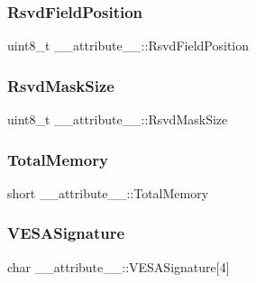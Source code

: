 \subsubsection{\texorpdfstring{Rsvd\+Field\+Position}{RsvdFieldPosition}}
{\footnotesize\ttfamily uint8\+\_\+t \+\_\+\+\_\+attribute\+\_\+\+\_\+\+::\+Rsvd\+Field\+Position}

\hypertarget{struct____attribute_____a73862db83bdb9b6d31356af3cec7a5be}{}\label{struct____attribute_____a73862db83bdb9b6d31356af3cec7a5be} 
\subsubsection{\texorpdfstring{Rsvd\+Mask\+Size}{RsvdMaskSize}}
{\footnotesize\ttfamily uint8\+\_\+t \+\_\+\+\_\+attribute\+\_\+\+\_\+\+::\+Rsvd\+Mask\+Size}

\hypertarget{struct____attribute_____aad8c231af30c4ba0005f5bca523ecfc8}{}\label{struct____attribute_____aad8c231af30c4ba0005f5bca523ecfc8} 
\subsubsection{\texorpdfstring{Total\+Memory}{TotalMemory}}
{\footnotesize\ttfamily short \+\_\+\+\_\+attribute\+\_\+\+\_\+\+::\+Total\+Memory}

\hypertarget{struct____attribute_____ae836dd2f0cf91de8d1387bc606feb595}{}\label{struct____attribute_____ae836dd2f0cf91de8d1387bc606feb595} 
\subsubsection{\texorpdfstring{V\+E\+S\+A\+Signature}{VESASignature}}
{\footnotesize\ttfamily char \+\_\+\+\_\+attribute\+\_\+\+\_\+\+::\+V\+E\+S\+A\+Signature\mbox{[}4\mbox{]}}

\hypertarget{struct____attribute_____a14e4fe3377969955c48963300b715b37}{}\label{struct____attribute_____a14e4fe3377969955c48963300b715b37} 

